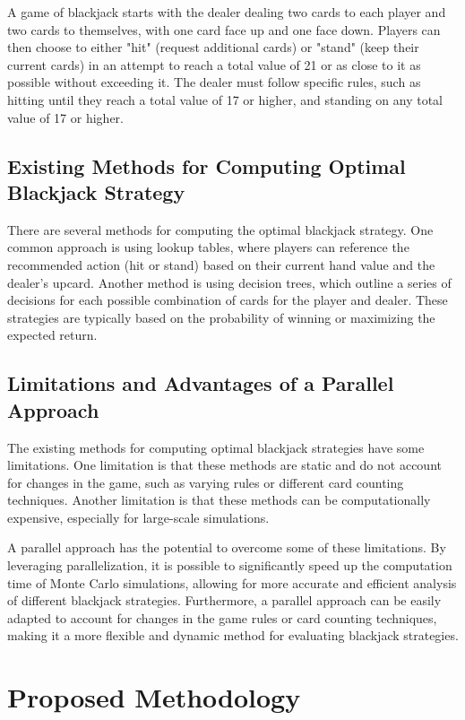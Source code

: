 \documentclass[twocolumn]{report}
\begin{document}
A game of blackjack starts with the dealer dealing two cards to each player and two cards to themselves, with one card face up and one face down. Players can then choose to either "hit" (request additional cards) or "stand" (keep their current cards) in an attempt to reach a total value of 21 or as close to it as possible without exceeding it. The dealer must follow specific rules, such as hitting until they reach a total value of 17 or higher, and standing on any total value of 17 or higher.
\newline
\subsection{Existing Methods for Computing Optimal Blackjack Strategy}
There are several methods for computing the optimal blackjack strategy. One common approach is using lookup tables, where players can reference the recommended action (hit or stand) based on their current hand value and the dealer's upcard. Another method is using decision trees, which outline a series of decisions for each possible combination of cards for the player and dealer. These strategies are typically based on the probability of winning or maximizing the expected return.

\subsection{Limitations and Advantages of a Parallel Approach}
The existing methods for computing optimal blackjack strategies have some limitations. One limitation is that these methods are static and do not account for changes in the game, such as varying rules or different card counting techniques. Another limitation is that these methods can be computationally expensive, especially for large-scale simulations.

A parallel approach has the potential to overcome some of these limitations. By leveraging parallelization, it is possible to significantly speed up the computation time of Monte Carlo simulations, allowing for more accurate and efficient analysis of different blackjack strategies. Furthermore, a parallel approach can be easily adapted to account for changes in the game rules or card counting techniques, making it a more flexible and dynamic method for evaluating blackjack strategies.

\section{Proposed Methodology}
\end{document}
